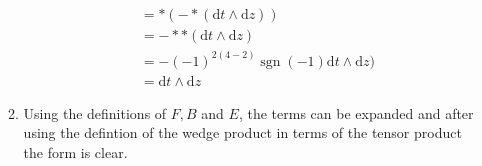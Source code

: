 \documentclass[12pt,a4]{article}
\DeclareMathOperator{\sign}{sgn}
\newcommand{\e}{\mathrm{d}}
\begin{document}
\begin{enumerate}
\begin{enumerate}
\begin{align*}
                 &= *(- *(\e t \wedge \e z))\\
                 &= -* *(\e t \wedge \e z)\\
                 &= -(-1)^{2 (4 -2)}\sign (-1)\e t \wedge \e z)\\
                 &= \e t \wedge \e z 
        \end{align*}
      \item
        Using the definitions of $F, B$ and $E$, the terms can be expanded and after using the defintion of the wedge product in terms of the tensor product the form is clear.

\end{enumerate}
\end{enumerate}
\end{document}
